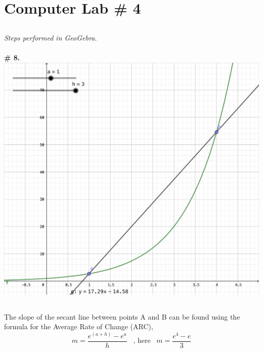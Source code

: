 \documentclass{article}
\renewcommand\thesubsection{\arabic{subsection}.}
\begin{document}
\section*{Computer Lab \# 4}

\renewcommand\thesubsection{1 - 9.}
\subsection{}
\emph{Steps performed in GeoGebra.}
\\
\\
\textbf{\# 8.} \\
\includegraphics[width=\textwidth]{cl4-8}

\renewcommand\thesubsection{\arabic{subsection}.}
\setcounter{subsection}{9}
\subsection{}
The slope of the secant line between points A and B can
be found using the formula for the Average Rate of Change (ARC),
$$
m = \frac{e^{(a+h)} - e^a}{h} \hspace{6pt}\text{ , here  }\hspace{6pt} m = \frac{e^{4} - e}{3}
$$
\pagebreak
\end{document}

